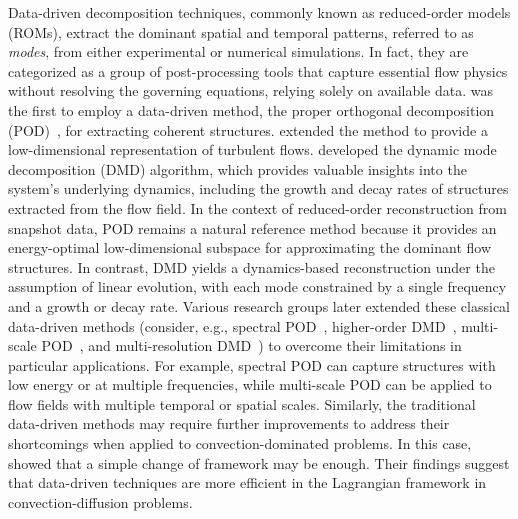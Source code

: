 \documentclass[a4paper,fleqn]{cas-sc}
\begin{document}
	Data-driven decomposition techniques, commonly known as reduced-order models (ROMs), extract the dominant spatial and temporal patterns, referred to as \textit{modes}, from either experimental or numerical simulations. In fact, they are categorized as a group of post-processing tools that capture essential flow physics without resolving the governing equations, relying solely on available data. \citet{Lumley1967166} was the first to employ a data-driven method, the proper orthogonal decomposition (POD)~\cite{volkwein2013proper,Berkooz1993}, for extracting coherent structures. \citet{Holmes1996} extended the method to provide a low-dimensional representation of turbulent flows. \citet{SCHMID2010} developed the dynamic mode decomposition (DMD) algorithm, which provides valuable insights into the system's underlying dynamics, including the growth and decay rates of structures extracted from the flow field. In the context of reduced-order reconstruction from snapshot data, POD remains a natural reference method because it provides an energy-optimal low-dimensional subspace for approximating the dominant flow structures. In contrast, DMD yields a dynamics-based reconstruction under the assumption of linear evolution, with each mode constrained by a single frequency and a growth or decay rate. Various research groups later extended these classical data-driven methods (consider, e.g., spectral POD~\cite{Towne2018}, higher-order DMD~\cite{LeClainche2017}, multi-scale POD~\cite{Mendez2019}, and multi-resolution DMD~\cite{Kutzz2016a}) to overcome their limitations in particular applications. For example, spectral POD can capture structures with low energy or at multiple frequencies, while multi-scale POD can be applied to flow fields with multiple temporal or spatial scales. Similarly, the traditional data-driven methods may require further improvements to address their shortcomings when applied to convection-dominated problems. In this case, \citet{Lu2020} showed that a simple change of framework may be enough. Their findings suggest that data-driven techniques are more efficient in the Lagrangian framework in convection-diffusion problems. 
	
\end{document}
